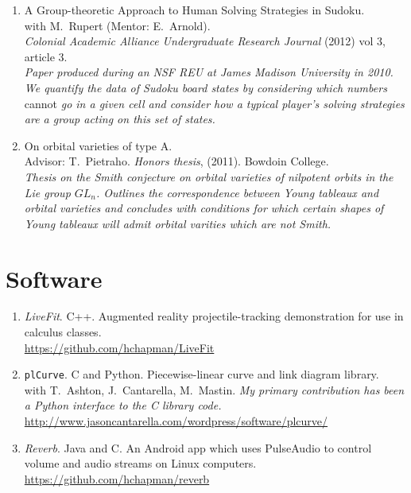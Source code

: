\documentclass[letterpaper]{article}
\begin{document}
\begin{enumerate}
{    crossings. Our enumeration method is based on identifying knot
    diagrams with a class of embedded 4-regular planar graphs.}
\item A Group-theoretic Approach to Human Solving Strategies in
  Sudoku.\\
  with M.\ Rupert (Mentor: E.\ Arnold). \\
  \textit{Colonial Academic
    Alliance
    Undergraduate Research Journal} (2012) vol 3, article 3.\\
  \textit{Paper produced during an NSF REU at James Madison University
    in 2010. We quantify the data of Sudoku board states by
    considering which numbers} cannot \textit{go in a given cell and
    consider how a typical player's solving strategies are a group
    acting on this set of states.}
\item On orbital varieties of type A. \\
  Advisor: T.\ Pietraho. \textit{Honors thesis}, (2011). Bowdoin
  College.\\
  \textit{Thesis on the Smith conjecture on orbital varieties of
    nilpotent orbits in the Lie group $GL_n$.  Outlines the
    correspondence between Young tableaux and orbital varieties and
    concludes with conditions for which certain shapes of Young
    tableaux will admit orbital varities which are not Smith.}
\end{enumerate}

\section*{Software}

\begin{enumerate}
\item \emph{LiveFit}. C++. Augmented reality projectile-tracking demonstration
  for use in calculus classes. \\
  \url{https://github.com/hchapman/LiveFit}
\item \texttt{plCurve}. C and Python. Piecewise-linear curve and link diagram library.\\
  with T.\ Ashton, J.\ Cantarella, M.\ Mastin.
  \textit{My primary contribution has been a Python interface to the C
    library code.} \\
  \url{http://www.jasoncantarella.com/wordpress/software/plcurve/}
\item \emph{Reverb}. Java and C. An Android app which uses PulseAudio to
  control volume and audio streams on Linux computers. \\
  \url{https://github.com/hchapman/reverb}
\end{enumerate}
\end{document}
